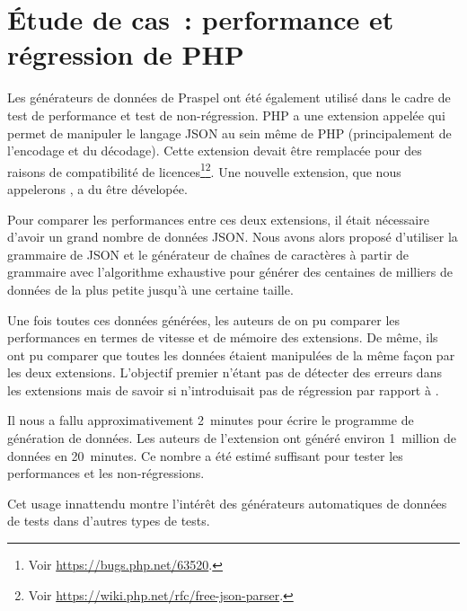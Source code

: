 \section{Étude de cas~: performance et régression de PHP}
\label{section:experimentation:php}

Les générateurs de données de Praspel ont été également utilisé dans le cadre de
test de performance et test de non-régression. PHP a une extension appelée
 qui permet de manipuler le langage JSON au sein même de PHP
(principalement de l'encodage et du décodage). Cette extension devait être
remplacée pour des raisons de compatibilité de licences\footnote{Voir
\url{https://bugs.php.net/63520}.}\footnote{Voir
\url{https://wiki.php.net/rfc/free-json-parser}.}. Une nouvelle extension, que
nous appelerons , a du être dévelopée.

Pour comparer les performances entre ces deux extensions, il était nécessaire
d'avoir un grand nombre de données JSON. Nous avons alors proposé d'utiliser la
grammaire de JSON et le générateur de chaînes de caractères à partir de
grammaire avec l'algorithme exhaustive pour générer des centaines de milliers de
données de la plus petite jusqu'à une certaine taille.

Une fois toutes ces données générées, les auteurs de  on pu
comparer les performances en termes de vitesse et de mémoire des extensions. De
même, ils ont pu comparer que toutes les données étaient manipulées de la même
façon par les deux extensions. L'objectif premier n'étant pas de détecter des
erreurs dans les extensions mais de savoir si  n'introduisait
pas de régression par rapport à .

Il nous a fallu approximativement 2~minutes pour écrire le programme de
génération de données. Les auteurs de l'extension ont généré environ 1~million
de données en 20~minutes. Ce nombre a été estimé suffisant pour tester les
performances et les non-régressions.

Cet usage innattendu montre l'intérêt des générateurs automatiques de données de
tests dans d'autres types de tests.

